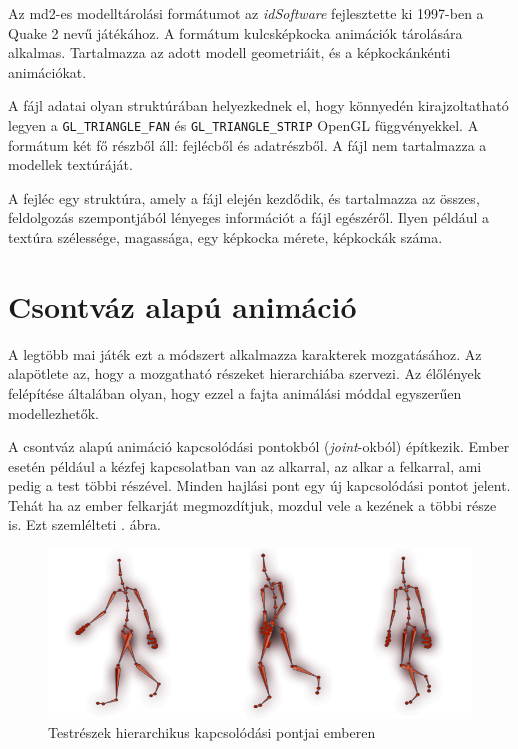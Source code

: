 Az md2-es modelltárolási formátumot az \textit{idSoftware} fejlesztette ki 1997-ben a Quake 2 nevű játékához. A formátum kulcsképkocka animációk tárolására alkalmas. Tartalmazza az adott modell geometriáit, és a képkockánkénti animációkat. 

A fájl adatai olyan struktúrában helyezkednek el, hogy könnyedén kirajzoltatható legyen a \texttt{GL\_TRIANGLE\_FAN} és \texttt{GL\_TRIANGLE\_STRIP} OpenGL függvényekkel. A formátum két fő részből áll: fejlécből és adatrészből. A fájl nem tartalmazza a modellek textúráját.

A fejléc egy struktúra, amely a fájl elején kezdődik, és tartalmazza az összes, feldolgozás szempontjából lényeges információt a fájl egészéről. Ilyen például a textúra szélessége, magassága, egy képkocka mérete, képkockák száma.

\section{Csontváz alapú animáció}

A legtöbb mai játék ezt a módszert alkalmazza karakterek mozgatásához. Az alapötlete az, hogy a mozgatható részeket hierarchiába szervezi. Az élőlények felépítése általában olyan, hogy ezzel a fajta animálási móddal egyszerűen modellezhetők. 

A csontváz alapú animáció kapcsolódási pontokból (\textit{joint}-okból) építkezik. Ember esetén például a kézfej kapcsolatban van az alkarral, az alkar a felkarral, ami pedig a test többi részével. Minden hajlási pont egy új kapcsolódási pontot jelent. Tehát ha az ember felkarját megmozdítjuk, mozdul vele a kezének a többi része is. Ezt szemlélteti . ábra.

\begin{figure}[h]
\centering
\includegraphics[scale=0.5]{kepek/skeletal_anim.png}
\caption[]{Testrészek hierarchikus kapcsolódási pontjai emberen\footnotemark}
\label{fig:skeletal}
\end{figure}

